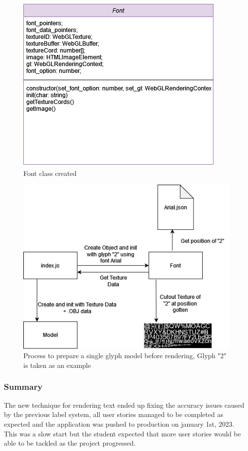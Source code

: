 \begin{figure}[h]
    \centering
    \includegraphics[width=0.8\columnwidth]{author-files/figures/Fontv1.png}
    \caption{Font class created}
    \label{fig:arial}
\end{figure}

\begin{figure}[h]
    \centering
    \includegraphics[width=0.8\columnwidth]{author-files/figures/fontprocess.png}
    \caption{Process to prepare a single glyph model before rendering, Glyph "2" is taken as an example}
    \label{fig:fontprocess}
\end{figure}

\subsubsection{Summary}
The new technique for rendering text ended up fixing the accuracy issues caused by the previous label system, all user stories managed to be completed as expected and the application was pushed to production on january 1st, 2023. This was a slow start but the student expected that more user stories would be able to be tackled as the project progressed.

